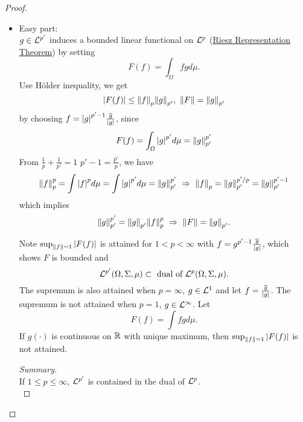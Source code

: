 \begin{proof}\
\begin{itemize}
    \item Easy part:\\
    $g \in \mathcal{L}^{p'}$ induces a bounded linear functional on $\mathcal{L}^p$ (\hyperref[RRT]{Riesz Representation Theorem}) by setting 
    \begin{equation*}
        F(f) = \int_\Omega fg d\mu.
    \end{equation*} 
    Use H\"older inequality, we get
    \begin{equation*}
        \abs{F(f)} \leq \norm{f}_p \norm{g}_{p'},\ \norm{F} = \norm{g}_{p'}    
    \end{equation*} 
    by choosing $f = \abs{g}^{p' - 1} \frac{\overline{g}}{\abs{g}}$, since 
    \begin{equation*}
        F(f) = \int_\Omega \abs{g}^{p'} d\mu = \norm{g}_{p'}^{p'}
    \end{equation*}
    From $\frac{1}{p} + \frac{1}{p'} = 1$ \imply $p' - 1 = \frac{p'}{p}$, we have 
    \begin{equation*}
        \norm{f}_{p}^p = \int \abs{f}^p d\mu = \int \abs{g}^{p'} d\mu = \norm{g}_{p'}^{p'}\ \Rightarrow\ \norm{f}_p = \norm{g}_{p'}^{p'/p} = \norm{g}_{p'}^{p' - 1}
    \end{equation*}
    which implies
    \begin{equation*}
      \norm{g}_{p'}^{p'} = \norm{g}_{p'} \norm{f}_p^p\ \Rightarrow\ \norm{F} = \norm{g}_{p'}.  
    \end{equation*}
    \begin{remark}
    Note $\sup_{\norm{f} = 1} \abs{F(f)}$ is attained for $1 < p < \infty$ with $f = g^{p'-1} \frac{\overline{g}}{\abs{g}}$, which shows $F$ is bounded and 
    $$\mathcal{L}^{p'}(\Omega,\Sigma, \mu) \subset \text{ dual of } \mathcal{L}^p(\Omega, \Sigma, \mu).$$ The supremum is also attained when $p = \infty$, $g \in \mathcal{L}^1$ and let $f = \frac{\overline{g}}{\abs{g}}$. The supremum is not attained when $p = 1$, $g \in \mathcal{L}^\infty$. Let 
    \begin{equation*}
        F(f) = \int fg d\mu.
    \end{equation*}
    If $g(\cdot)$ is continuous on $\mathbb{R}$ with unique maximum, then $\sup_{\norm{f} = 1} \abs{F(f)}$ is not attained.  
    \end{remark}
    \begin{proof}[Summary]\ \\
    If $1 \leq p \leq \infty$, $\mathcal{L}^{p'}$ is contained in the dual of $\mathcal{L}^p$.\\ 

\end{proof}
\end{itemize}
\end{proof}
